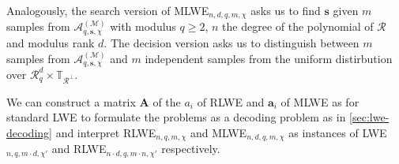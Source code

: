 Analogously, the search version of MLWE$_{n, d, q, m, \chi}$ asks us to find $\mathbf{s}$ given $m$ samples from $\mathcal{A}_{q, \mathbf{s}, \chi}^{(\mathcal{M})}$ with modulus $q\geq 2$, $n$ the degree of the polynomial of $\mathcal{R}$ and modulus rank $d$. The decision version asks us to distinguish between $m$ samples from $\mathcal{A}_{q, \mathbf{s}, \chi}^{(\mathcal{M})}$ and $m$ independent samples from the uniform distirbution over $\mathcal{R}_q^d \times \mathbb{T}_{\mathcal{R}^\perp}$.

We can construct a matrix $\mathbf{A}$ of the $a_i$ of RLWE and $\mathbf{a}_i$ of MLWE as for standard LWE to formulate the problems as a decoding problem as in \cref{sec:lwe-decoding} and interpret RLWE$_{n, q, m, \chi}$ and MLWE$_{n, d, q, m, \chi}$ as instances of LWE$_{n, q, m \cdot d, \chi'}$ and RLWE$_{n\cdot d, q, m \cdot n, \chi'}$ respectively.

